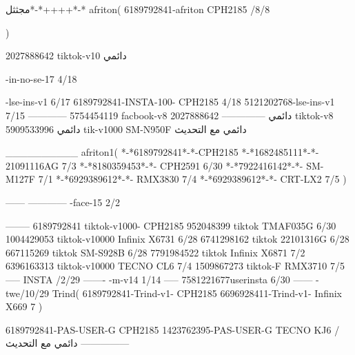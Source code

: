 مجثثل*-*++++*-*
afriton(
6189792841-afriton CPH2185  /8/8

)

2027888642 tiktok-v10
دائمي

-in-no-se-17 4/18

-lse-ins-v1 6/17
6189792841-INSTA-100- CPH2185 4/18
5121202768-lse-ins-v1 7/15
------------
5754454119 facbook-v8
دائمي
--------------
2027888642 tiktok-v8
دائمي
5909533996 tik-v1000  SM-N950F
دائمي مع التحديث

__________
afriton1(
*-*6189792841*-*-CPH2185
*-*1682485111*-*- 21091116AG  7/3
*-*8180359453*-*-  CPH2591  6/30
*-*7922416142*-*-  SM-M127F  7/1
*-*6929389612*-*-  RMX3830  7/4
*-*6929389612*-*-  CRT-LX2  7/5
)


------
------------
-face-15 2/2

--------
6189792841 tiktok-v1000- CPH2185 
952048399 tiktok TMAF035G  6/30
1004429053 tiktok-v10000 Infinix X6731  6/28
6741298162 tiktok 22101316G  6/28
667115269 tiktok SM-S928B  6/28
7791984522 tiktok Infinix X6871  7/2
6396163313 tiktok-v10000 TECNO CL6  7/4
1509867273 tiktok-F RMX3710  7/5
-----
 INSTA /2/29
-------
-m-v14 1/14
-----
7581221677userinsta 6/30
------
-twe/10/29
Trind(
6189792841-Trind-v1- CPH2185 
6696928411-Trind-v1- Infinix X669 7\2
)


6189792841-PAS-USER-G CPH2185 
1423762395-PAS-USER-G TECNO KJ6  /دائمي مع التحديث
    ---------------
